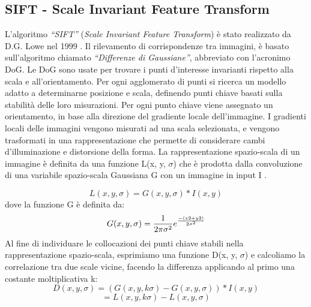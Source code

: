 \subsection{SIFT - Scale Invariant Feature Transform}
L'algoritmo \textit{``SIFT''} (\textit{Scale Invariant Feature Transform}) è stato realizzato da D.G. Lowe nel 1999 \cite{Lowe2004}. Il rilevamento di corrispondenze tra immagini, è basato sull'algoritmo chiamato \textit{``Differenze di Gaussiane''}, abbreviato con l'acronimo DoG. Le DoG sono usate per trovare i punti d'interesse invarianti rispetto alla scala e all'orientamento. Per ogni agglomerato di punti si ricerca un modello adatto a determinarne posizione e scala, definendo punti chiave basati sulla stabilità delle loro misurazioni. Per ogni punto chiave viene assegnato un orientamento, in base alla direzione del gradiente locale dell'immagine. I gradienti locali delle immagini vengono misurati ad una scala selezionata, e vengono trasformati in una rappresentazione che permette di considerare cambi d'illuminazione e distorsione della forma.\hfill \break
\noindent La rappresentazione spazio-scala di un immagine è definita da una funzione L(x, y, \(\sigma\)) che è prodotta dalla convoluzione di una variabile spazio-scala Gaussiana G con un immagine in input I \cite{Lowe2004}. \par
\begin{equation}
	L(x, y, \sigma) = G(x, y, \sigma) * I(x, y)
\end{equation}
\noindent dove la funzione G è definita da:
\begin{equation}
    G(x, y, \sigma) = \frac{1}{2\pi\sigma^2}e^\frac{-(x2+y2)}{2\sigma^2}
\end{equation}
\noindent
Al fine di individuare le collocazioni dei punti chiave stabili nella rappresentazione spazio-scala, esprimiamo una funzione D(x, y, \(\sigma\)) e calcoliamo la correlazione tra due scale vicine, facendo la differenza applicando al primo una costante moltiplicativa k:
\begin{equation}
	D(x, y, \sigma) = (G(x, y, k\sigma) - G(x, y, \sigma)) * I(x, y)
\end{equation}
\begin{equation}
    = L(x, y, k\sigma) - L(x, y, \sigma)
\end{equation}
